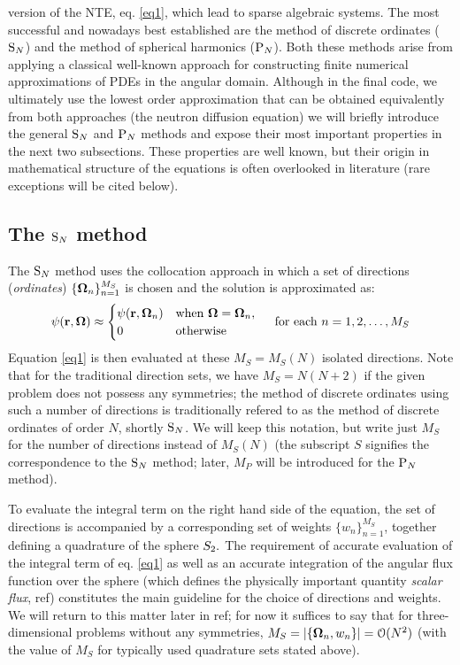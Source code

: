 version of the NTE, eq.
\eqref{eq1}, which lead to sparse algebraic systems. The most successful and nowadays best established are the method
of discrete ordinates ($\text{S}_{N}$) and the method of spherical harmonics ($\text{P}_{N}$).
Both these methods arise from applying a classical well-known approach for constructing finite numerical
approximations of PDEs  in the
angular domain. Although in the final code, we ultimately use the lowest order approximation that can be obtained
equivalently from both approaches (the neutron diffusion equation) we will briefly introduce the general
$\text{S}_{N}$ and $\text{P}_{N}$ methods and expose their most important properties in the next two subsections. These properties are
well known, but their origin in mathematical structure of the equations is often overlooked in literature (rare
exceptions will be cited below). 

\subsection{The $\text{S}_{N}$ method}\label{sec:1-SN}
The $\text{S}_{N}$ method uses the collocation approach in which a set of directions (\textit{ordinates})
$\{\mathbf{\Omega}_n\}_{n=1}^{M_S}$ is chosen and the solution is approximated as:
\begin{equation}\label{eq:sn_approx} 
	\psi(\mathbf{r}, \mathbf{\Omega}) \approx \begin{cases}\displaystyle \psi(\mathbf{r},\mathbf{\Omega}_n) & \mbox{when $\mathbf{\Omega} = \mathbf{\Omega}_n$},\\ 0 & \mbox{otherwise} \end{cases}\quad
	\text{ for each } n = 1,2,\ldots,M_S 
\end{equation}
Equation \eqref{eq1} is then evaluated at these $M_S = M_S(N)$ isolated directions.
Note that for the traditional direction sets, we have $M_S = N(N+2)$ if the given problem does not possess any symmetries; the
method of discrete ordinates using such a number of directions is traditionally refered to as the method of discrete
ordinates of order $N$, shortly $\text{S}_{N}$. We will keep this notation, but  write just $M_S$ for the number of directions
instead of $M_S(N)$ (the subscript $S$ signifies the correspondence to the $\text{S}_{N}$ method; later, $M_P$ will be
introduced for the $\text{P}_{N}$ method).

To evaluate the integral term on the right hand side of the equation, the set of directions is accompanied by a
corresponding set of weights $\{w_n\}_{n=1}^{M_S}$, together defining a quadrature of the sphere $S_2.$ The
requirement of accurate evaluation of the integral term of eq.
\eqref{eq1} as well as an accurate integration of the angular flux function over the sphere (which defines the
physically important quantity \textit{scalar flux}, \alert{ref}) constitutes the main guideline for the choice of
directions and weights. We will return to this matter later in \alert{ref}; for now it suffices to say that for
three-dimensional problems without any symmetries, \mbox{$M_S = \left|\{\mathbf{\Omega}_n, w_n\}\right| = \mathcal{O}(N^2)$} (with the
value of $M_S$ for typically used quadrature sets stated above).

